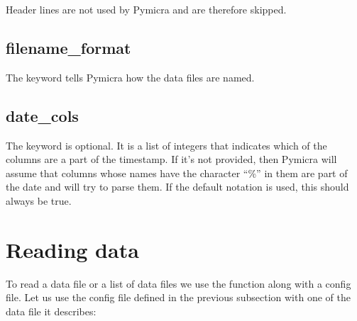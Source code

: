 \documentclass[a4paper,10pt,oneside]{sphinxmanual}
\begin{document}
Header lines are not used by Pymicra and are therefore skipped.


\subsection{filename\_format}
\label{basics:filename-format}
The  keyword tells Pymicra how the data files are named.


\subsection{date\_cols}
\label{basics:date-cols}
The  keyword is optional. It is a list of integers that indicates
which of the columns are a part of the timestamp. If it's not provided, then
Pymicra will assume that columns whose names have the character ``\%'' in them are
part of the date and will try to parse them. If the default notation is used,
this should always be true.


\section{Reading data}
\label{basics:reading-data}
To read a data file or a list of data files we use the function  along with
a config file. Let us use the config file defined in the previous subsection with one of the data
file it describes:
\end{document}
